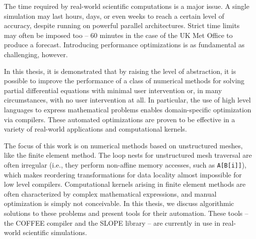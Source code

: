 The time required by real-world scientific computations is a major issue. A single simulation may last hours, days, or even weeks to reach a certain level of accuracy, despite running on powerful parallel architectures. Strict time limits may often be imposed too -- 60 minutes in the case of the UK Met Office to produce a forecast. Introducing performance optimizations is as fundamental as challenging, however. 

In this thesis, it is demonstrated that by raising the level of abstraction, it is possible to improve the performance of a class of numerical methods for solving partial differential equations with minimal user intervention or, in many circumstances, with no user intervention at all. In particular, the use of high level languages to express mathematical problems enables domain-specific optimization via compilers. These automated optimizations are proven to be effective in a variety of real-world applications and computational kernels.

The focus of this work is on numerical methods based on unstructured meshes, like the finite element method. The loop nests for unstructured mesh traversal are often irregular (i.e., they perform non-affine memory accesses, such as {\tt A[B[i]]}), which makes reordering transformations for data locality almost impossible for low level compilers. Computational kernels arising in finite element methods are often characterized by complex mathematical expressions, and manual optimization is simply not conceivable. In this thesis, we discuss algorithmic solutions to these problems and present tools for their automation. These tools -- the COFFEE compiler and the SLOPE library -- are currently in use in real-world scientific simulations.

